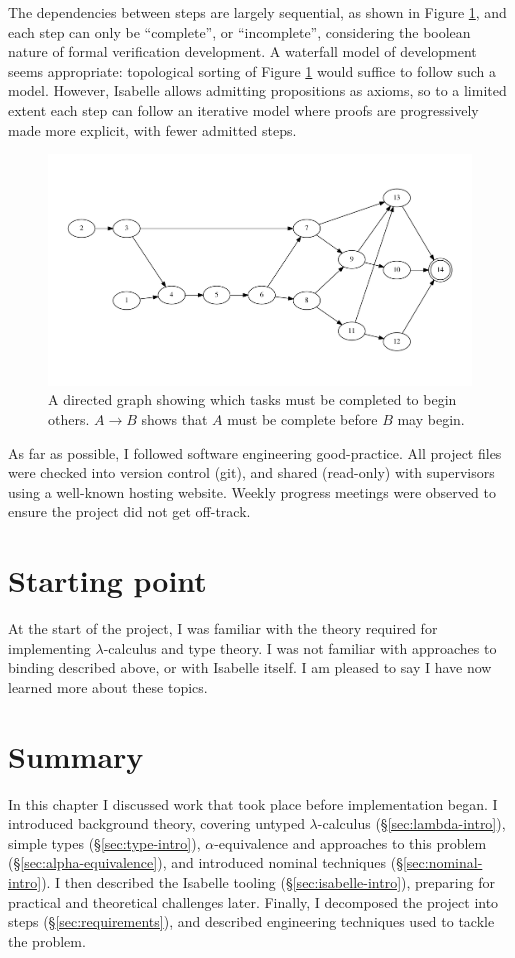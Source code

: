 The dependencies between steps are largely sequential, as shown in Figure \ref{fig:requirements-dependencies}, and each step can only be ``complete'', or ``incomplete'', considering the boolean nature of formal verification development.
A waterfall model of development seems appropriate: topological sorting of Figure \ref{fig:requirements-dependencies} would suffice to follow such a model.
However, Isabelle allows admitting propositions as axioms, so to a limited extent each step can follow an iterative model where proofs are progressively made more explicit, with fewer admitted steps.

\begin{figure}
\centering
\includegraphics[width=\textwidth]{chapters/preparation/figures/dependencies}
\caption{A directed graph showing which tasks must be completed to begin others. \(A \to B\) shows that \(A\) must be complete before \(B\) may begin.}
\label{fig:requirements-dependencies}
\end{figure}

As far as possible, I followed software engineering good-practice.
All project files were checked into version control (git), and shared (read-only) with supervisors using a well-known hosting website.
Weekly progress meetings were observed to ensure the project did not get off-track.

\section{Starting point}
At the start of the project, I was familiar with the theory required for implementing \(\lambda\)-calculus and type theory.
I was not familiar with approaches to binding described above, or with Isabelle itself.
I am pleased to say I have now learned more about these topics.

\section{Summary}
In this chapter I discussed work that took place before implementation began.
I introduced background theory, covering untyped \(\lambda\)-calculus (\S\ref{sec:lambda-intro}), simple types (\S\ref{sec:type-intro}), \(\alpha\)-equivalence and approaches to this problem (\S\ref{sec:alpha-equivalence}), and introduced nominal techniques (\S\ref{sec:nominal-intro}).
I then described the Isabelle tooling (\S\ref{sec:isabelle-intro}), preparing for practical and theoretical challenges later.
Finally, I decomposed the project into steps (\S\ref{sec:requirements}), and described engineering techniques used to tackle the problem.

